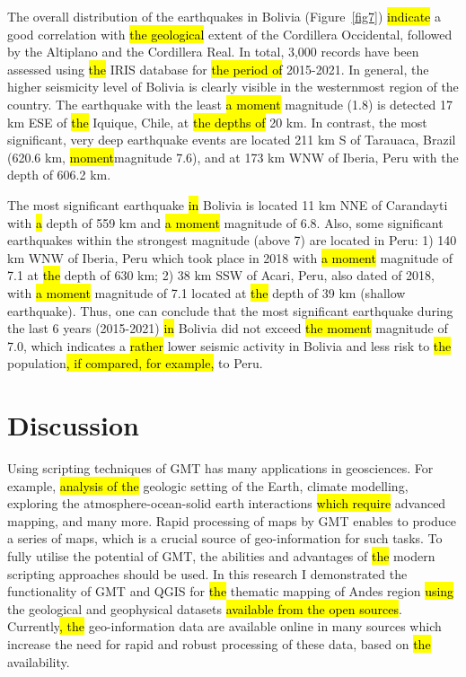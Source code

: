 \documentclass[data,article,submit,pdftex,moreauthors]{Definitions/mdpi}
\begin{document}
The overall distribution of the earthquakes in Bolivia (Figure~\ref{fig7}) \hl{indicate} a good correlation with \hl{the geological} extent of the Cordillera Occidental, followed by the Altiplano and the Cordillera Real. In total, 3,000 records have been assessed using \hl{the} IRIS database for \hl{the period of} 2015-2021. In general, the higher seismicity level of Bolivia is clearly visible in the westernmost region of the country. The earthquake with the least \hl{a moment} magnitude (1.8) is detected 17 km ESE of \hl{the} Iquique, Chile, at \hl{the depths of} 20 km. In contrast, the most significant, very deep earthquake events are located 211 km S of Tarauaca, Brazil (620.6 km, \hl{moment}magnitude 7.6), and at 173 km WNW of Iberia, Peru with the depth of 606.2 km.

The most significant earthquake \hl{in} Bolivia is located 11 km NNE of Carandayti with \hl{a} depth of 559 km and \hl{a moment} magnitude of 6.8. Also, some significant earthquakes within the strongest magnitude (above 7) are located in Peru: 1) 140 km WNW of Iberia, Peru which took place in 2018 with \hl{a moment} magnitude of 7.1 at \hl{the} depth of 630 km; 2) 38 km SSW of Acari, Peru, also dated of 2018, with \hl{a moment} magnitude of 7.1 located at \hl{the} depth of 39 km (shallow earthquake). Thus, one can conclude that the most significant earthquake during the last 6 years (2015-2021) \hl{in} Bolivia did not exceed \hl{the moment} magnitude of 7.0, which indicates a \hl{rather} lower seismic activity in Bolivia and less risk to \hl{the} population\hl{, if compared, for example,} to Peru. 

\section{Discussion}

Using scripting techniques of GMT has many applications in geosciences. For example, \hl{analysis of the} geologic setting of the Earth, climate modelling, exploring the atmosphere-ocean-solid earth interactions \hl{which require} advanced mapping, and many more. Rapid processing of maps by GMT enables to produce a series of maps, which is a crucial source of geo-information for such tasks. To fully utilise the potential of GMT, the abilities and advantages of \hl{the} modern scripting approaches should be used. In this research I demonstrated the functionality of GMT and QGIS for \hl{the} thematic mapping of Andes region \hl{using} the geological and geophysical datasets \hl{available from the open sources}. Currently\hl{, the} geo-information data are available online in many sources which increase the need for rapid and robust processing of these data, based on \hl{the} availability. 
\end{document}
